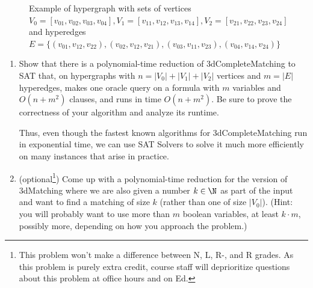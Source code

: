 \documentclass[11pt]{article}
\begin{document}
\begin{enumerate}
\begin{figure}[h]

\caption{\centering Example of hypergraph with sets of vertices $V_0 = [v_{01}, v_{02}, v_{03}, v_{04}], V_1 = [v_{11}, v_{12}, v_{13}, v_{14}], V_2 = [v_{21}, v_{22}, v_{23}, v_{24}]$ and hyperedges $E = \{(v_{01}, v_{12}, v_{22}), (v_{02}, v_{12}, v_{21}), (v_{03}, v_{11}, v_{23}), (v_{04}, v_{14}, v_{24})\}$}



\end{figure}

\begin{enumerate}
\item Show that there is a polynomial-time reduction of 3dCompleteMatching to SAT that, on hypergraphs with $n=|V_0|+|V_1|+|V_2|$ vertices and $m=|E|$ hyperedges, makes one oracle query on a formula with $m$ variables and $O(n + m^2)$ clauses, and runs in time $O(n + m^2)$.  Be sure to prove the correctness of your algorithm and analyze its runtime.

Thus, even though the fastest known algorithms for 3dCompleteMatching run in exponential time, we can use SAT Solvers to solve it much more efficiently on many instances that arise in practice.


\item (optional\footnote{This problem won't make a difference between N, L, R-, and R grades. As this problem is purely extra credit, course staff will deprioritize questions about this problem at office hours and on Ed.}) Come up with a polynomial-time reduction for the version of 3dMatching where we are also given a number $k\in \N$ as part of the input and want to find a matching of size $k$ (rather than one of size $|V_0|$).  (Hint: you will probably want to use more than $m$ boolean variables, at least $k\cdot m$, possibly more, depending on how you approach the problem.)


\end{enumerate}
\end{enumerate}
\end{document}
